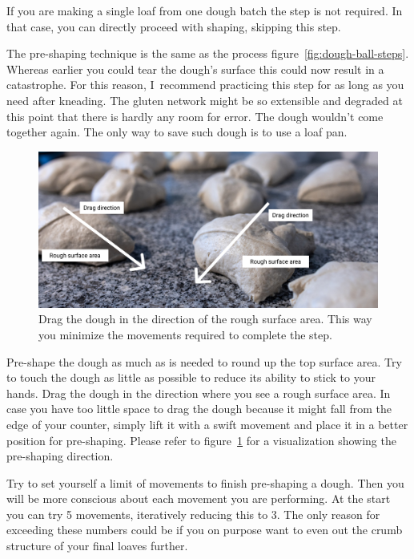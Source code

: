 If you are making a single loaf from one dough batch the step is not required.
In that case, you can directly proceed with shaping, skipping this step.

The pre-shaping technique is the same as the process figure~\ref{fig:dough-ball-steps}.
Whereas earlier you could tear the dough's surface this could now result in a catastrophe.
For this reason, I~recommend practicing this step for as long as you need after kneading.
The gluten network might be so extensible and degraded at this point that there
is hardly any room for error. The dough wouldn't come together again. The only
way to save such dough is to use a loaf pan.

\begin{figure}[!htb]
  \includegraphics[width=\textwidth]{preshape-direction}
  \caption[Dragging direction]{Drag the dough in the direction of the rough
      surface area. This way you minimize the movements required to complete
      the step.}%
  \label{fig:preshape-direction}
\end{figure}

Pre-shape the dough as much as is needed to round up the top
surface area. Try to touch the dough as little as possible
to reduce its ability to stick to your hands. Drag the dough
in the direction where you see a rough surface area. In
case you have too little space to drag the dough because it might
fall from the edge of your counter, simply lift it with a swift movement and place
it in a better position for pre-shaping. Please refer to figure~\ref{fig:preshape-direction}
for a visualization showing the pre-shaping direction.

Try to set yourself a limit of movements to finish pre-shaping
a dough. Then you will be more conscious about each movement
you are performing. At the start you can try 5 movements,
iteratively reducing this to 3. The only reason for exceeding these
numbers could be if you on purpose want to even out the crumb
structure of your final loaves further.

